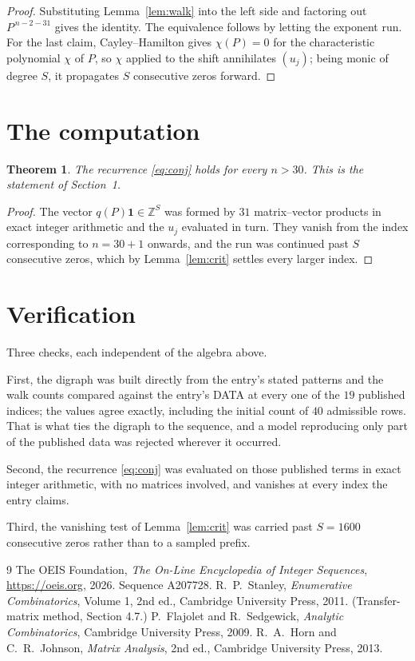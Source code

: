 \documentclass[11pt,a4paper]{article}
\theoremstyle{plain}
\newtheorem{theorem}{Theorem}
\theoremstyle{definition}
\begin{document}
\begin{proof}
Substituting Lemma~\ref{lem:walk} into the left side and factoring out
$P^{\,n-2-31}$ gives the identity. The equivalence follows by letting the exponent
run. For the last claim, Cayley--Hamilton gives $\chi(P)=0$ for the characteristic
polynomial $\chi$ of $P$, so $\chi$ applied to the shift annihilates $(u_j)$; being monic of
degree $S$, it propagates $S$ consecutive zeros forward.
\end{proof}

\section{The computation}

\begin{theorem}
The recurrence \eqref{eq:conj} holds for every $n>30$. This is the statement of
Section~1.
\end{theorem}

\begin{proof}
The vector $q(P)\mathbf{1}\in\mathbb{Z}^{S}$ was formed by $31$ matrix--vector
products in exact integer arithmetic and the $u_j$ evaluated in turn. They vanish from the
index corresponding to $n=30+1$ onwards, and the run was continued past $S$ consecutive
zeros, which by Lemma~\ref{lem:crit} settles every larger index.
\end{proof}

\section{Verification}

Three checks, each independent of the algebra above.

First, the digraph was built directly from the entry's stated patterns and the walk counts
compared against the entry's DATA at every one of the $19$ published indices; the
values agree exactly, including the initial count of $40$ admissible rows. That is
what ties the digraph to the sequence, and a model reproducing only part of the published
data was rejected wherever it occurred.

Second, the recurrence \eqref{eq:conj} was evaluated on those published terms in exact
integer arithmetic, with no matrices involved, and vanishes at every index the entry claims.

Third, the vanishing test of Lemma~\ref{lem:crit} was carried past $S=1600$ consecutive
zeros rather than to a sampled prefix.

\begin{thebibliography}{9}
 The OEIS Foundation, \emph{The On-Line Encyclopedia of Integer
Sequences}, \url{https://oeis.org}, 2026. Sequence A207728.
 R.~P.~Stanley, \emph{Enumerative Combinatorics}, Volume 1, 2nd ed.,
Cambridge University Press, 2011. (Transfer-matrix method, Section 4.7.)
 P.~Flajolet and R.~Sedgewick, \emph{Analytic Combinatorics}, Cambridge
University Press, 2009.
 R.~A.~Horn and C.~R.~Johnson, \emph{Matrix Analysis}, 2nd ed., Cambridge
University Press, 2013.
\end{thebibliography}
\end{document}

